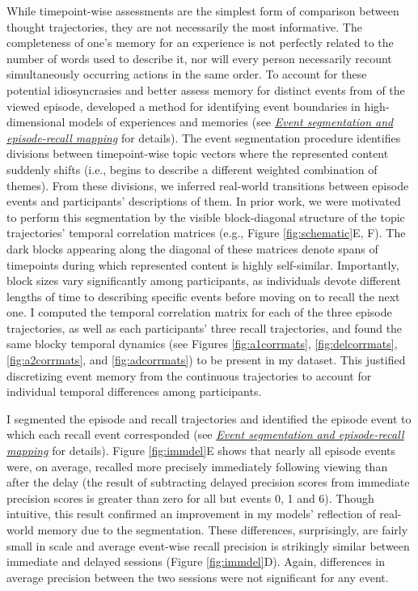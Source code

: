 \documentclass{article}
\begin{document}
While timepoint-wise assessments are the simplest form of comparison between thought trajectories, they are not necessarily the most informative.  The completeness of one's memory for an experience is not perfectly related to the number of words used to describe it, nor will every person necessarily recount simultaneously occurring actions in the same order.  To account for these potential idiosyncrasies and better assess memory for distinct events from of the viewed episode, \cite{HeusEtal18c} developed a method for identifying event boundaries in high-dimensional models of experiences and memories (see \hyperref[sec:eventseg]{\textit{Event segmentation and episode-recall mapping}} for details).  The event segmentation procedure identifies divisions between timepoint-wise topic vectors where the represented content suddenly shifts (i.e., begins to describe a different weighted combination of themes).  From these divisions, we inferred real-world transitions between episode events and participants' descriptions of them.  In prior work, we were motivated to perform this segmentation by the visible block-diagonal structure of the topic trajectories' temporal correlation matrices (e.g., Figure \ref{fig:schematic}E, F).  The dark blocks appearing along the diagonal of these matrices denote spans of timepoints during which represented content is highly self-similar.  Importantly, block sizes vary significantly among participants, as individuals devote different lengths of time to describing specific events before moving on to recall the next one.  I computed the temporal correlation matrix for each of the three episode trajectories, as well as each participants' three recall trajectories, and found the same blocky temporal dynamics (see Figures \ref{fig:a1corrmats}, \ref{fig:delcorrmats}, \ref{fig:a2corrmats}, and \ref{fig:adcorrmats}) to be present in my dataset.  This justified discretizing event memory from the continuous trajectories to account for individual temporal differences among participants.  

I segmented the episode and recall trajectories and identified the episode event to which each recall event corresponded (see \hyperref[sec:eventseg]{\textit{Event segmentation and episode-recall mapping}} for details).  Figure \ref{fig:immdel}E shows that nearly all episode events were, on average, recalled more precisely immediately following viewing than after the delay (the result of subtracting delayed precision scores from immediate precision scores is greater than zero for all but events 0, 1 and 6).  Though intuitive, this result confirmed an improvement in my models' reflection of real-world memory due to the segmentation.  These differences, surprisingly, are fairly small in scale and average event-wise recall precision is strikingly similar between immediate and delayed sessions (Figure \ref{fig:immdel}D).  Again, differences in average precision between the two sessions were not significant for any event.
\end{document}
